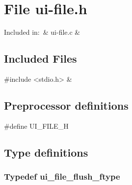 

\section{File ui-file.h}
\label{file_ui-file.h}

\begin{cxreftabii}
Included in:\ & ui-file.c & \\
\end{cxreftabii}


\subsection*{Included Files}

\begin{cxreftabi}
{\stt \#include <stdio.h>} &\\
\end{cxreftabi}


\subsection*{Preprocessor definitions}

{\stt \#define UI\_FILE\_H}


\subsection{Type definitions}


\subsubsection{Typedef ui\_file\_flush\_ftype}
\label{type_ui_file_flush_ftype_ui-file.h}

